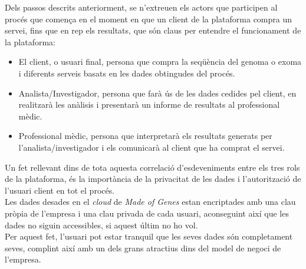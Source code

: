 Dels passos descrits anteriorment, se n'extreuen els actors que participen al procés que comença en el moment en que un client de la plataforma compra un servei, fins que en rep els resultats, que són claus per entendre el funcionament de la plataforma:
\begin{itemize}
    \item El client, o usuari final, persona que compra la seqüència del genoma o exoma i diferents serveis basats en les dades obtingudes del procés.
    \item Analista/Investigador, persona que farà ús de les dades cedides pel client, en realitzarà les anàlisis i presentarà un informe de resultats al professional mèdic.
    \item Professional mèdic, persona que interpretarà els resultats generats per l’analista/investigador i els comunicarà al client que ha comprat el servei.
\end{itemize}
Un fet rellevant dins de tota aquesta correlació d'esdeveniments entre els tres rols de la plataforma, és la importància de la privacitat de les dades i l'autorització de l'usuari client en tot el procés.\\
Les dades desades en el \textit{cloud} de \textit{Made of Genes} estan encriptades amb una clau pròpia de l'empresa i una clau privada de cada usuari, aconseguint així que les dades no siguin accessibles, si aquest últim no ho vol.\\
Per aquest fet, l'usuari pot estar tranquil que les seves dades són completament seves, complint així amb un dels grans atractius dins del model de negoci de l'empresa.
